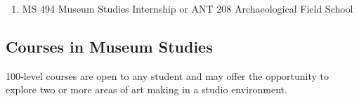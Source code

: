 \documentclass[
  letterpaper,
]{scrbook}
\begin{document}
\begin{enumerate}
  COM 231 Communication in Teams (WE)\\
  COM 322 Prof Communication \& Writing (WE)\\
  COM 327 Organizational Communication (WE)\\
  COM 377 Language, Power, and Social Change\\
  DS 100 Introduction to Data Science\\
  DS 230 Data-Centric Computing\\
  Any HIS course\\
  IS 116 Intro to International Studies\\
  PR 205 Public Relations\\
\item
  MS 494 Museum Studies Internship or ANT 208 Archaeological Field
  School
\end{enumerate}

\subsection{Courses in Museum Studies}\label{courses-in-museum-studies}

100-level courses are open to any student and may offer the opportunity
to explore two or more areas of art making in a studio environment.
\end{document}
